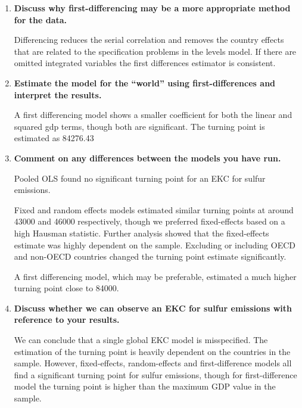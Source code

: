 \documentclass{scrartcl}
\begin{document}
\begin{enumerate}
	
		
	\item \textbf{Discuss why first-differencing may be a more appropriate method for the data.}
	
	Differencing reduces the serial correlation and removes the country effects that are related to the specification problems in the levels model. If there are omitted integrated variables the first
differences estimator is consistent.
	
	\item \textbf{Estimate the model for the ``world'' using first-differences and interpret the results.}
	
	
	
	A first differencing model shows a smaller coefficient for both the linear and squared gdp terms, though both are significant. The turning point is estimated as 84276.43
	
	\item \textbf{Comment on any differences between the models you have run.}
	
	Pooled OLS found no significant turning point for an EKC for sulfur emissions. 
	
	Fixed and random effects models estimated similar turning points at around 43000 and 46000 respectively, though we preferred fixed-effects based on a high Hausman statistic. Further analysis showed that the fixed-effects estimate was highly dependent on the sample. Excluding or including OECD and non-OECD countries changed the turning point estimate significantly. 
	
	A first differencing model, which may be preferable, estimated a much higher turning point close to 84000. 
	
	\item \textbf{Discuss whether we can observe an EKC for sulfur emissions with reference to your results.}
	
	We can conclude that a single global EKC model is misspecified. The estimation of the turning point is heavily dependent on the countries in the sample. However, fixed-effects, random-effects and first-difference models all find a significant turning point for sulfur emissions, though for first-difference model the turning point is higher than the maximum GDP value in the sample.
	
	\end{enumerate}
	
\end{document}
